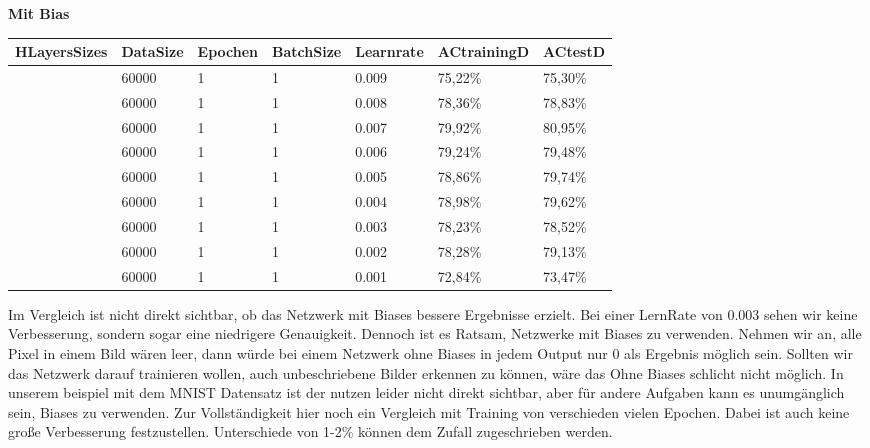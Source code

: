 \documentclass[12pt]{article}
\begin{document}
\begin{table}[H]
	\textbf{ Mit Bias}
    \centering
    \begin{tabular}{|l|l|l|l|l|l|l|}
    \hline
        HLayersSizes & DataSize & Epochen & BatchSize & Learnrate & ACtrainingD & ACtestD \\ \hline
        [784, 100, 10] & 60000 & 1 & 1 & 0.009 & 75,22\% & 75,30\% \\ \hline
        [784, 100, 10] & 60000 & 1 & 1 & 0.008 & 78,36\% & 78,83\% \\ \hline
        [784, 100, 10] & 60000 & 1 & 1 & 0.007 & 79,92\% & 80,95\% \\ \hline
        [784, 100, 10] & 60000 & 1 & 1 & 0.006 & 79,24\% & 79,48\% \\ \hline
        [784, 100, 10] & 60000 & 1 & 1 & 0.005 & 78,86\% & 79,74\% \\ \hline
        [784, 100, 10] & 60000 & 1 & 1 & 0.004 & 78,98\% & 79,62\% \\ \hline
        [784, 100, 10] & 60000 & 1 & 1 & 0.003 & 78,23\% & 78,52\% \\ \hline
        [784, 100, 10] & 60000 & 1 & 1 & 0.002 & 78,28\% & 79,13\% \\ \hline
        [784, 100, 10] & 60000 & 1 & 1 & 0.001 & 72,84\% & 73,47\% \\ \hline
    \end{tabular}
\end{table}
Im Vergleich ist nicht direkt sichtbar, ob das Netzwerk mit Biases bessere Ergebnisse erzielt. Bei einer LernRate von 0.003 sehen wir keine Verbesserung, sondern sogar eine niedrigere Genauigkeit.
Dennoch ist es Ratsam, Netzwerke mit Biases zu verwenden. Nehmen wir an, alle Pixel in einem Bild wären leer, dann würde bei einem Netzwerk ohne Biases in jedem Output nur 0 als Ergebnis möglich sein. Sollten wir das Netzwerk darauf trainieren wollen, auch unbeschriebene Bilder erkennen zu können, wäre das Ohne Biases schlicht nicht möglich. In unserem beispiel mit dem MNIST Datensatz ist der nutzen leider nicht direkt sichtbar, aber für andere Aufgaben kann es unumgänglich sein, Biases zu verwenden.
Zur Vollständigkeit hier noch ein Vergleich mit Training von verschieden vielen Epochen. Dabei ist auch keine große Verbesserung festzustellen. Unterschiede von 1-2\% können dem Zufall zugeschrieben werden.
\end{document}
